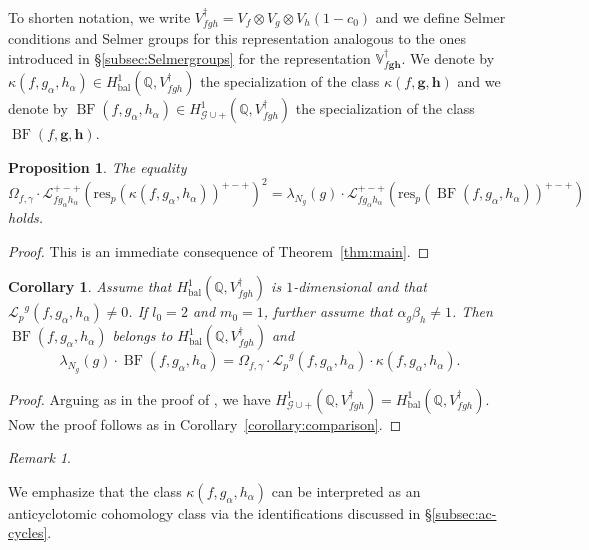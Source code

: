 \documentclass[a4paper,11pt]{amsart}
\theoremstyle{plain}
\newtheorem{corollary}[theorem]{Corollary}
\newtheorem{proposition}[theorem]{Proposition}
\theoremstyle{definition}
\theoremstyle{remark}
\newtheorem{remarkwr}[theorem]{Remark}
\newenvironment{remark}{\begin{remarkwr}\begin{upshape}}{\end{upshape}\end{remarkwr}}
\newcommand{\bb}{\mathbb}
\newcommand{\cl}{\mathcal}
\DeclareMathOperator{\BF}{BF}
\DeclareMathOperator{\bal}{bal}
\newcommand{\Lp}{{\mathscr{L}_p}}
\newcommand{\hg}{{\mathbf{g}}}
\newcommand{\hh}{{\mathbf h}}
\newcommand{\res}{\mathrm{res}}
\numberwithin{equation}{section}
\begin{document}
To shorten notation, we write $V_{fgh}^\dagger=V_f\otimes V_g\otimes V_h(1-c_0)$ and we define Selmer conditions and Selmer groups for this representation analogous to the ones introduced in \S\ref{subsec:Selmergroups} for the representation $\bb{V}_{f\hg\hh}^\dagger$. We denote by $\kappa(f,g_\alpha,h_\alpha)\in H^1_{\bal}(\bb{Q},V_{fgh}^\dagger)$ the specialization of the class $\kappa(f,\hg,\hh)$ and we denote by $\BF(f,g_\alpha,h_\alpha)\in H^1_{\cl{G}\cup +}(\bb{Q},V_{fgh}^\dagger)$ the specialization of the class $\BF(f,\hg,\hh)$.

\begin{proposition}\label{prop:main-nonexceptional}
    The equality
    \[
    \Omega_{f,\gamma} \cdot \cl{L}_{fg_\alpha h_\alpha}^{+-+}(\res_p(\kappa(f,g_\alpha,h_\alpha))^{+-+})^2 =\lambda_{N_g}(g) \cdot \mathcal{L}_{f g_\alpha h_\alpha}^{+-+}(\res_p(\BF(f, g_\alpha, h_\alpha))^{+-+})
    \]
    holds.
\end{proposition}
\begin{proof}
    This is an immediate consequence of Theorem~\ref{thm:main}.
\end{proof}


\begin{corollary}\label{cor:non-exceptionalcomparison}
    Assume that $H^1_{\bal}(\bb{Q}, V_{fgh}^\dagger)$ is $1$-dimensional and that $\Lp^g(f,g_\alpha,h_\alpha)\neq 0$. If $l_0=2$ and $m_0=1$, further assume that $\alpha_g\beta_h\neq 1$. Then $\BF(f,g_\alpha,h_\alpha)$ belongs to $H^1_{\bal}(\bb{Q}, V_{fgh}^\dagger)$ and
    \[
    \lambda_{N_g}(g)\cdot\BF(f,g_\alpha,h_\alpha)=\Omega_{f,\gamma}\cdot \Lp^g(f,g_\alpha,h_\alpha) \cdot \kappa(f,g_\alpha,h_\alpha).
    \]
\end{corollary}
\begin{proof}
    Arguing as in the proof of \cite[Thm~9.5]{ACR}, we have $H^1_{\cl{G}\cup+}(\bb{Q},V_{fgh}^\dagger)=H^1_{\bal}(\bb{Q},V_{fgh}^\dagger)$. Now the proof follows as in Corollary~\ref{corollary:comparison}.
\end{proof}

\begin{remark}
We emphasize that the class $\kappa(f,g_\alpha,h_\alpha)$ can be interpreted as an anticyclotomic cohomology class via the identifications discussed in \S\ref{subsec:ac-cycles}.
\end{remark}
\end{document}
